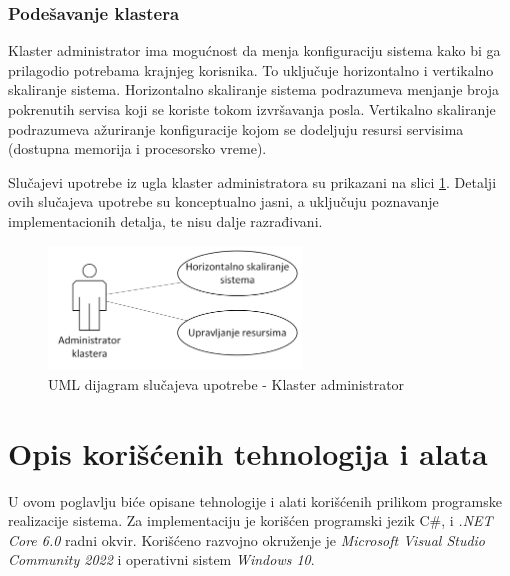 \documentclass[12pt,oneside]{memoir}
\begin{document}
\subsection{Podešavanje klastera}
Klaster administrator ima mogućnost da menja konfiguraciju sistema kako bi ga prilagodio potrebama krajnjeg korisnika. To uključuje horizontalno i vertikalno skaliranje sistema. Horizontalno skaliranje sistema podrazumeva menjanje broja pokrenutih servisa koji se koriste tokom izvršavanja posla. Vertikalno skaliranje podrazumeva ažuriranje konfiguracije kojom se dodeljuju resursi servisima (dostupna memorija i procesorsko vreme).

Slučajevi upotrebe iz ugla klaster administratora su prikazani na slici \ref{fig:slucajupotrebe_admin_klastera}. Detalji ovih slučajeva upotrebe su konceptualno jasni, a uključuju poznavanje implementacionih detalja, te nisu dalje razrađivani.

\begin{figure}[!ht]
  \centering
  \label{fig:slucajupotrebe_admin_klastera}
  \includegraphics[width=0.6\textwidth]{./images/dijagram_slucajeva_upotrebe_administrator_klastera.png}
  \caption{UML dijagram slučajeva upotrebe - Klaster administrator}
\end{figure}

\chapter{Opis korišćenih tehnologija i alata}
\label{chp:opistehialata}

U ovom poglavlju biće opisane tehnologije i alati korišćenih prilikom programske realizacije sistema.
Za implementaciju je korišćen programski jezik C\#, i \emph{.NET Core 6.0} radni okvir. Korišćeno razvojno okruženje je \emph{Microsoft Visual Studio Community 2022} i operativni sistem \emph{Windows 10}.
\end{document}
